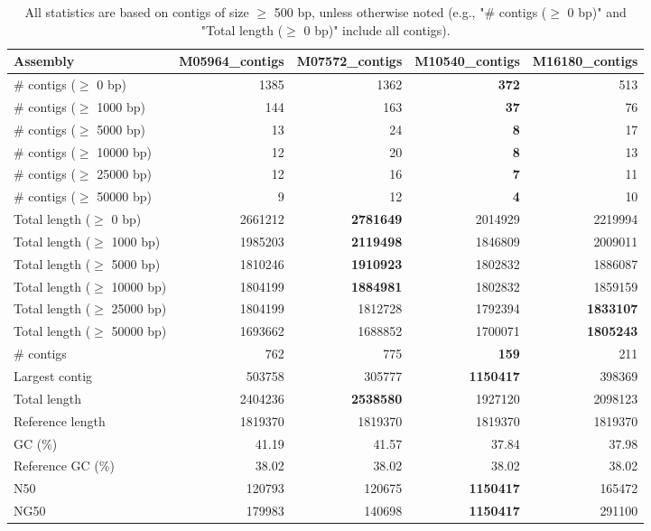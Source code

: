 \documentclass[12pt,a4paper]{article}
\begin{document}
\begin{table}[ht]
\begin{center}
\caption{All statistics are based on contigs of size $\geq$ 500 bp, unless otherwise noted (e.g., "\# contigs ($\geq$ 0 bp)" and "Total length ($\geq$ 0 bp)" include all contigs).}
\begin{tabular}{|l*{4}{|r}|}
\hline
Assembly & M05964\_contigs & M07572\_contigs & M10540\_contigs & M16180\_contigs \\ \hline
\# contigs ($\geq$ 0 bp) & 1385 & 1362 & {\bf 372} & 513 \\ \hline
\# contigs ($\geq$ 1000 bp) & 144 & 163 & {\bf 37} & 76 \\ \hline
\# contigs ($\geq$ 5000 bp) & 13 & 24 & {\bf 8} & 17 \\ \hline
\# contigs ($\geq$ 10000 bp) & 12 & 20 & {\bf 8} & 13 \\ \hline
\# contigs ($\geq$ 25000 bp) & 12 & 16 & {\bf 7} & 11 \\ \hline
\# contigs ($\geq$ 50000 bp) & 9 & 12 & {\bf 4} & 10 \\ \hline
Total length ($\geq$ 0 bp) & 2661212 & {\bf 2781649} & 2014929 & 2219994 \\ \hline
Total length ($\geq$ 1000 bp) & 1985203 & {\bf 2119498} & 1846809 & 2009011 \\ \hline
Total length ($\geq$ 5000 bp) & 1810246 & {\bf 1910923} & 1802832 & 1886087 \\ \hline
Total length ($\geq$ 10000 bp) & 1804199 & {\bf 1884981} & 1802832 & 1859159 \\ \hline
Total length ($\geq$ 25000 bp) & 1804199 & 1812728 & 1792394 & {\bf 1833107} \\ \hline
Total length ($\geq$ 50000 bp) & 1693662 & 1688852 & 1700071 & {\bf 1805243} \\ \hline
\# contigs & 762 & 775 & {\bf 159} & 211 \\ \hline
Largest contig & 503758 & 305777 & {\bf 1150417} & 398369 \\ \hline
Total length & 2404236 & {\bf 2538580} & 1927120 & 2098123 \\ \hline
Reference length & 1819370 & 1819370 & 1819370 & 1819370 \\ \hline
GC (\%) & 41.19 & 41.57 & 37.84 & 37.98 \\ \hline
Reference GC (\%) & 38.02 & 38.02 & 38.02 & 38.02 \\ \hline
N50 & 120793 & 120675 & {\bf 1150417} & 165472 \\ \hline
NG50 & 179983 & 140698 & {\bf 1150417} & 291100 \\ \hline

\end{tabular}
\end{center}
\end{table}
\end{document}
